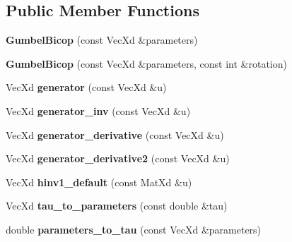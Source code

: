 \subsection*{Public Member Functions}
\begin{DoxyCompactItemize}
\item 
{\bfseries Gumbel\+Bicop} (const Vec\+Xd \&parameters)\hypertarget{class_gumbel_bicop_a96f6d7548161eefbc68999d52095eef3}{}\label{class_gumbel_bicop_a96f6d7548161eefbc68999d52095eef3}

\item 
{\bfseries Gumbel\+Bicop} (const Vec\+Xd \&parameters, const int \&rotation)\hypertarget{class_gumbel_bicop_a54f07cbf2630e03ddb81cbb1a07bbe9f}{}\label{class_gumbel_bicop_a54f07cbf2630e03ddb81cbb1a07bbe9f}

\item 
Vec\+Xd {\bfseries generator} (const Vec\+Xd \&u)\hypertarget{class_gumbel_bicop_a7462d2e917ed8f9c7c768bc763062000}{}\label{class_gumbel_bicop_a7462d2e917ed8f9c7c768bc763062000}

\item 
Vec\+Xd {\bfseries generator\+\_\+inv} (const Vec\+Xd \&u)\hypertarget{class_gumbel_bicop_a1aac5fc1926ebb1a7a5477fea8eafc4e}{}\label{class_gumbel_bicop_a1aac5fc1926ebb1a7a5477fea8eafc4e}

\item 
Vec\+Xd {\bfseries generator\+\_\+derivative} (const Vec\+Xd \&u)\hypertarget{class_gumbel_bicop_a04ad137cdb969fdcb38141dd55cc08ca}{}\label{class_gumbel_bicop_a04ad137cdb969fdcb38141dd55cc08ca}

\item 
Vec\+Xd {\bfseries generator\+\_\+derivative2} (const Vec\+Xd \&u)\hypertarget{class_gumbel_bicop_ab86b728ad0f0db50711e25defc39a1ad}{}\label{class_gumbel_bicop_ab86b728ad0f0db50711e25defc39a1ad}

\item 
Vec\+Xd {\bfseries hinv1\+\_\+default} (const Mat\+Xd \&u)\hypertarget{class_gumbel_bicop_ace2f375b5d67a02f3af9488ebe4120e5}{}\label{class_gumbel_bicop_ace2f375b5d67a02f3af9488ebe4120e5}

\item 
Vec\+Xd {\bfseries tau\+\_\+to\+\_\+parameters} (const double \&tau)\hypertarget{class_gumbel_bicop_a0128ce09c2184f9b71f4b54c2790ed84}{}\label{class_gumbel_bicop_a0128ce09c2184f9b71f4b54c2790ed84}

\item 
double {\bfseries parameters\+\_\+to\+\_\+tau} (const Vec\+Xd \&parameters)\hypertarget{class_gumbel_bicop_a6755267e48f12c29d943416c60e9f33f}{}\label{class_gumbel_bicop_a6755267e48f12c29d943416c60e9f33f}

\end{DoxyCompactItemize}

